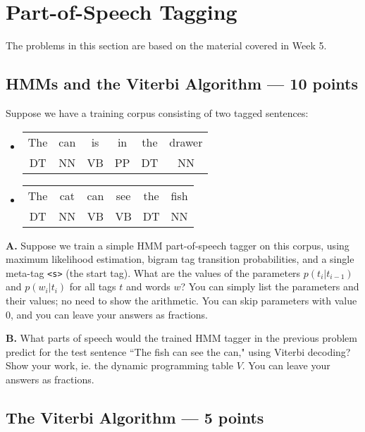 \documentclass[12pt,a4paper]{article}
\begin{document}
\section{Part-of-Speech Tagging}

The problems in this section are based on the material covered in Week 5.

\subsection{HMMs and the Viterbi Algorithm --- 10 points}

Suppose we have a training corpus consisting of two tagged sentences:
\begin{itemize}
\item
\begin{tabular}{c c c c c c}
The & can & is & in & the & drawer \\
DT & NN & VB & PP & DT & NN
\end{tabular}
\item
\begin{tabular}{c c c c c c}
The & cat & can & see & the & fish \\
DT & NN & VB & VB & DT & NN
\end{tabular}
\end{itemize}

\vspace{\baselineskip}

\textbf{A.} Suppose we train a simple HMM part-of-speech tagger on this corpus, using maximum likelihood estimation, bigram tag transition probabilities, and a single meta-tag {\tt <s>} (the start tag). What are the values of the parameters $p(t_i | t_{i-1})$ and $p(w_i | t_i)$ for all tags $t$ and words $w$? You can simply list the parameters and their values; no need to show the arithmetic. You can skip parameters with value 0, and you can leave your answers as fractions.

\vspace{\baselineskip}

\textbf{B.} What parts of speech would the trained HMM tagger in the previous problem predict for the test sentence ``The fish can see the can," using Viterbi decoding? Show your work, ie. the dynamic programming table $V$. You can leave your answers as fractions.

\vspace{\baselineskip}

\subsection{The Viterbi Algorithm --- 5 points} 
\end{document}
